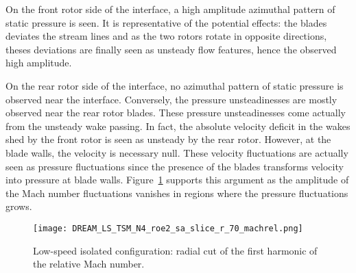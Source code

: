 On the front rotor side of the interface, a high amplitude azimuthal 
pattern of static pressure is seen. It is representative
of the potential effects: the blades deviates the stream lines and
as the two rotors rotate in opposite directions, theses deviations
are finally seen as unsteady flow features, hence the observed high amplitude.

On the rear rotor side of the interface, no azimuthal pattern 
of static pressure is observed near the interface.
Conversely, the pressure unsteadinesses are mostly observed near the rear rotor blades.
These pressure unsteadinesses come actually from the unsteady wake passing.
In fact, the absolute velocity deficit in the wakes shed by the front rotor
is seen as unsteady by the rear rotor. However, at the blade walls,
the velocity is necessary null. These 
velocity fluctuations are actually seen as pressure fluctuations since the presence
of the blades transforms velocity into pressure at blade walls.
Figure~\ref{fig:dream_ls_hb_radial_cuts_machrel}
supports this argument as the amplitude of the Mach number fluctuations
vanishes in regions where the pressure fluctuations grows.
\begin{figure}[htp]
  \centering
  \texttt{[image: DREAM\_LS\_TSM\_N4\_roe2\_sa\_slice\_r\_70\_machrel.png]}
  \caption{Low-speed isolated configuration: radial cut of the first harmonic of the
  relative Mach number.}
  \label{fig:dream_ls_hb_radial_cuts_machrel}
\end{figure}

